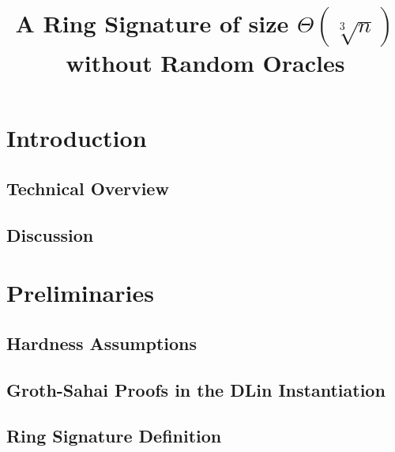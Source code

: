 \documentclass{llncs}
\title{A Ring Signature of size $\Theta(\sqrt[3]{n})$ without Random Oracles}
\begin{document}
	
\maketitle
\begin{abstract}
    
\end{abstract} 

\section{Introduction}

     

   \subsection{Technical Overview} \label{sec:tech-overview}

	

    \subsection{Discussion}

    	



\section{Preliminaries}

	

	\subsection{Hardness Assumptions}

	
        
	\subsection{Groth-Sahai Proofs in the DLin Instantiation} \label{sec:gs-proofs}
        
            

                \subsection{Ring Signature Definition}
    
            
\end{document}
